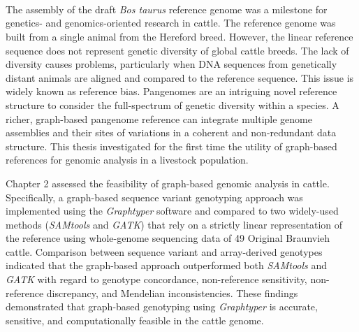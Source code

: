 \documentclass[11 pt, a4paper, notitlepage, twoside]{report}
\begin{document}
\newcommand*{\BuildingFromMainFile}{}



\iftwoside
\newpage
\thispagestyle{empty}
\ 
\newpage
\fi


\newpage

\setcounter{tocdepth}{1}
\hypersetup{linkcolor=black}

{}
{
    \pagestyle{plain}
    \tableofcontents
}


\newpage

{}
\listoffigures 
\newpage

{}
\listoftables 
\newpage

{}
\section*{}
\thispagestyle{plain}

\setlength{\parskip}{\baselineskip}
\doublespacing
The assembly of the draft \emph{Bos taurus }reference genome was a milestone for genetics- and genomics-oriented research in cattle. The reference genome was built from a single animal from the Hereford breed. However, the linear reference sequence does not represent genetic diversity of global cattle breeds. The lack of diversity causes problems, particularly when DNA sequences from genetically distant animals are aligned and compared to the reference sequence. This issue is widely known as reference bias. Pangenomes are an intriguing novel reference structure to consider the full-spectrum of genetic diversity within a species. A richer, graph-based pangenome reference can integrate multiple  genome assemblies and their sites of variations in a coherent and non-redundant data structure. This thesis investigated for the first time the utility of graph-based references for genomic analysis in a livestock population.

Chapter 2 assessed the feasibility of graph-based genomic analysis in cattle. Specifically, a graph-based sequence variant genotyping approach was implemented using the\emph{ Graphtyper} software and compared to two widely-used methods (\emph{SAMtools } and \emph{GATK}) that rely on a strictly linear representation of the reference using whole-genome sequencing data of 49 Original Braunvieh cattle. Comparison between sequence variant and array-derived genotypes indicated that the graph-based approach outperformed both \emph{SAMtools} and \emph{GATK} with regard to genotype concordance, non-reference sensitivity, non-reference discrepancy, and Mendelian inconsistencies. These findings demonstrated that graph-based genotyping using \emph{Graphtyper} is accurate, sensitive, and computationally feasible in the cattle genome. 
\end{document}
